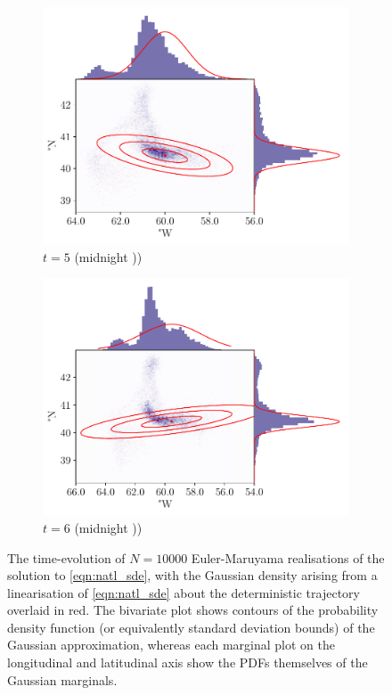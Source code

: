 \begin{figure}
\begin{center}
\begin{subfigure}{0.49\textwidth}
			\includegraphics[width=\textwidth]{chp06_applications/figures/gulf_stream/traj_stoch_em_5.0}
			\caption{\(t = 5\) (midnight ))}
		\end{subfigure}
		\begin{subfigure}{0.49\textwidth}
			\includegraphics[width=\textwidth]{chp06_applications/figures/gulf_stream/traj_stoch_em_6.0}
			\caption{\(t = 6\) (midnight ))}
		\end{subfigure}
		\caption{The time-evolution of \(N = 10000\) Euler-Maruyama realisations of the solution to \cref{eqn:natl_sde}, with the Gaussian density arising from a linearisation of \cref{eqn:natl_sde} about the deterministic trajectory overlaid in red.
			The bivariate plot shows contours of the probability density function (or equivalently standard deviation bounds) of the Gaussian approximation, whereas each marginal plot on the longitudinal and latitudinal axis show the PDFs themselves of the Gaussian marginals.}
		\label{fig:natl_em}
	\end{center}
\end{figure}

